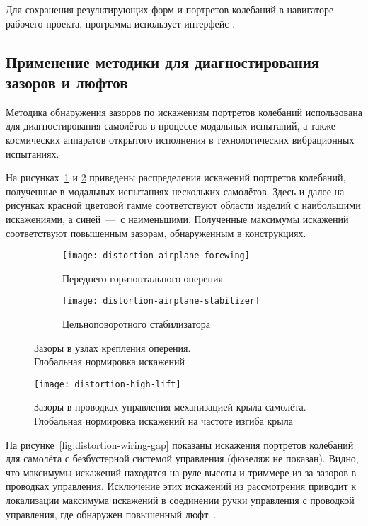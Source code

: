 Для сохранения результирующих форм и портретов колебаний в навигаторе рабочего проекта, программа использует интерфейс .

\subsection{Применение методики для диагностирования зазоров и люфтов}

Методика обнаружения зазоров по искажениям портретов колебаний использована для диагностирования самолётов в процессе модальных испытаний, а также космических аппаратов открытого исполнения в технологических вибрационных испытаниях. 

На рисунках~\ref{fig:distortion-airplane} и \ref{fig:distortion-high-lift} приведены распределения искажений портретов колебаний, полученные в модальных испытаниях нескольких самолётов. Здесь и далее на рисунках красной цветовой гамме соответствуют области изделий с наибольшими искажениями, а синей~---~с наименьшими. Полученные максимумы искажений соответствуют повышенным зазорам, обнаруженным в конструкциях.

\begin{figure}[!htb]
	\centerfloat
	\begin{subfigure}[t]{\sfDefects}
		\texttt{[image: distortion-airplane-forewing]}
		\caption{Переднего горизонтального оперения}
	\end{subfigure}
	\hfill
	\begin{subfigure}[t]{\sfDefects}
		\texttt{[image: distortion-airplane-stabilizer]} 
		\caption{Цельноповоротного стабилизатора}
	\end{subfigure}
    \caption{Зазоры в узлах крепления оперения. \\ Глобальная нормировка искажений} \label{fig:distortion-airplane}
\end{figure}

\begin{figure}[!htb]
	\centerfloat
	\texttt{[image: distortion-high-lift]}
	\caption{Зазоры в проводках управления механизацией крыла самолёта. Глобальная нормировка искажений на частоте изгиба крыла} \label{fig:distortion-high-lift}
\end{figure}

На рисунке~\ref{fig:distortion-wiring-gap} показаны искажения портретов колебаний для самолёта с безбустерной системой управления (фюзеляж не показан). Видно, что максимумы искажений находятся на руле высоты и триммере из-за зазоров в проводках управления. Исключение этих искажений из рассмотрения приводит к локализации максимума искажений в соединении ручки управления с проводкой управления, где обнаружен повышенный люфт~.

